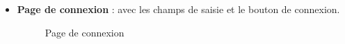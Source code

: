 \documentclass[12pt]{report}
\begin{document}
	\begin{itemize}
		
		\item \textbf{Page de connexion} : avec les champs de saisie et le bouton de connexion.
		
		\begin{figure}[H]
			\centering
			\begin{minipage}[t]{0.5\textwidth}
				\centering
				\caption{Page de connexion}
			\end{minipage}
		\end{figure}
		

\end{itemize}
\end{document}
